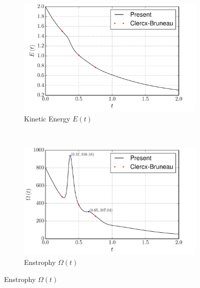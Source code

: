	\begin{figure}[p]
     \centering
     \begin{subfigure}[t]{0.5\textwidth}
             \includegraphics[width=\textwidth]{figures/eulerian/dipole_KineticEnergy_comparison.pdf}
             \caption{Kinetic Energy $E(t)$}
             \label{fig:dipole_KineticEnergy_comparison}
     \end{subfigure}%
     ~ %
     \begin{subfigure}[t]{0.5\textwidth}
             \includegraphics[width=\textwidth]{figures/eulerian/dipole_Enstrophy_comparison.pdf}
             \caption{Enstrophy $\Omega(t)$}
             \label{fig:dipole_Enstrophy_comparison}
     \end{subfigure}
     

\end{figure}
